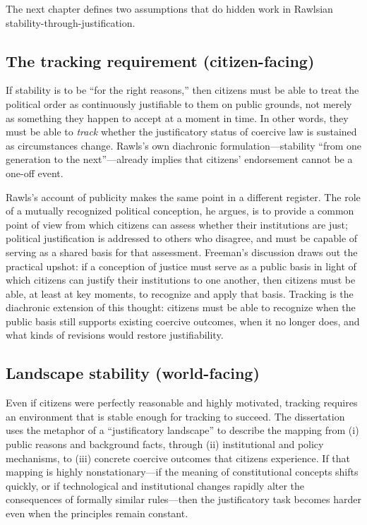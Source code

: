 \documentclass[12pt]{report}
\begin{document}
The next chapter defines two assumptions that do hidden work in Rawlsian stability-through-justification.

\subsection{The tracking requirement (citizen-facing)}
If stability is to be ``for the right reasons,'' then citizens must be able to treat the political order as continuously justifiable to them on public grounds, not merely as something they happen to accept at a moment in time. In other words, they must be able to \emph{track} whether the justificatory status of coercive law is sustained as circumstances change. Rawls's own diachronic formulation---stability ``from one generation to the next''\parencite[p.~1]{rawls1987overlapping}---already implies that citizens' endorsement cannot be a one-off event.

Rawls's account of publicity makes the same point in a different register. The role of a mutually recognized political conception, he argues, is to provide a common point of view from which citizens can assess whether their institutions are just; political justification is addressed to others who disagree, and must be capable of serving as a shared basis for that assessment.\parencite[p.~6]{rawls1987overlapping} Freeman's discussion draws out the practical upshot: if a conception of justice must serve as a public basis in light of which citizens can justify their institutions to one another,\parencite[p.~11]{freeman2007burdens} then citizens must be able, at least at key moments, to recognize and apply that basis. Tracking is the diachronic extension of this thought: citizens must be able to recognize when the public basis still supports existing coercive outcomes, when it no longer does, and what kinds of revisions would restore justifiability.

\subsection{Landscape stability (world-facing)}

Even if citizens were perfectly reasonable and highly motivated, tracking requires an environment that is stable enough for tracking to succeed. The dissertation uses the metaphor of a ``justificatory landscape'' to describe the mapping from (i) public reasons and background facts, through (ii) institutional and policy mechanisms, to (iii) concrete coercive outcomes that citizens experience. If that mapping is highly nonstationary---if the meaning of constitutional concepts shifts quickly, or if technological and institutional changes rapidly alter the consequences of formally similar rules---then the justificatory task becomes harder even when the principles remain constant.
\end{document}
